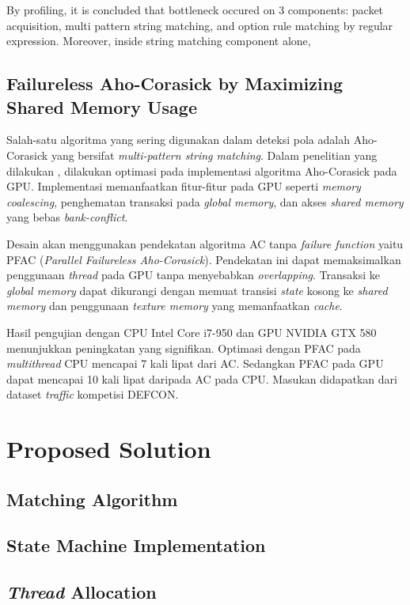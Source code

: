 \documentclass[conference]{IEEEtran}
\begin{document}
        By profiling, it is concluded that bottleneck occured on 3 components: packet acquisition, multi pattern string matching, and option rule matching by regular expression. Moreover, inside string matching component alone, 

    \subsection{Failureless Aho-Corasick by Maximizing Shared Memory Usage}

        Salah-satu algoritma yang sering digunakan dalam deteksi pola adalah Aho-Corasick yang bersifat \emph{multi-pattern string matching}. Dalam penelitian yang dilakukan \cite{lin2013}, dilakukan optimasi pada implementasi algoritma Aho-Corasick pada GPU. Implementasi memanfaatkan fitur-fitur pada GPU seperti \emph{memory coalescing}, penghematan transaksi pada \emph{global memory}, dan akses \emph{shared memory} yang bebas \emph{bank-conflict}.

        Desain akan menggunakan pendekatan algoritma AC tanpa \emph{failure function} yaitu PFAC (\emph{Parallel Failureless Aho-Corasick}). Pendekatan ini dapat memaksimalkan penggunaan \emph{thread} pada GPU tanpa menyebabkan \emph{overlapping}. Transaksi ke \emph{global memory} dapat dikurangi dengan memuat transisi \emph{state} kosong ke \emph{shared memory} dan penggunaan \emph{texture memory} yang memanfaatkan \emph{cache}.

        Hasil pengujian dengan CPU Intel Core i7-950 dan GPU NVIDIA GTX 580 menunjukkan peningkatan yang signifikan. Optimasi dengan PFAC pada \emph{multithread} CPU mencapai 7 kali lipat dari AC. Sedangkan PFAC pada GPU dapat mencapai 10 kali lipat daripada AC pada CPU. Masukan didapatkan dari dataset \emph{traffic} kompetisi DEFCON.

\section{Proposed Solution}
    \subsection{Matching Algorithm}
    \subsection{State Machine Implementation}
    \subsection{\emph{Thread} Allocation}
\end{document}
